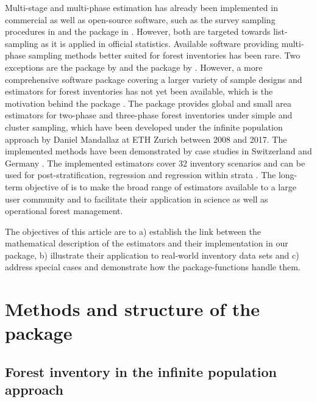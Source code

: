 Multi-stage and multi-phase estimation has already been implemented in commercial as well as open-source software, such as the survey sampling procedures in  \citep{sas} and the  package in  \citep{survey}. However, both are targeted towards list-sampling as it is applied in official statistics. Available software providing multi-phase sampling methods better suited for forest inventories has been rare. Two exceptions are the  package  by \citet{josae2015} and the  package by \citet{cullmann2016}. However, a more comprehensive software package covering a larger variety of sample designs and estimators for forest inventories has not yet been available, which is the motivation behind the  package . The package provides global and small area estimators for two-phase and three-phase forest inventories under simple and cluster sampling, which have been developed under the infinite population approach by Daniel Mandallaz at ETH Zurich between 2008 and 2017. The implemented methods have been demonstrated by case studies in Switzerland \citep{massey2014a, massey2015b, mandallaz2013b} and Germany \citep{hill2017c}. The implemented estimators cover 32 inventory scenarios and can be used for post-stratification, regression and regression within strata \citep{massey2015_thesis}. The long-term objective of  is to make the broad range of estimators available to a large user community and to facilitate their application in science as well as operational forest management.

The objectives of this article are to a) establish the link between the mathematical description of the estimators and their implementation in our package, b) illustrate their application to real-world inventory data sets and c) address special cases and demonstrate how the package-functions handle them.

\newpage


\section{Methods and structure of the package}
\label{sec:str_and_mod}


\subsection{Forest inventory in the infinite population approach}

